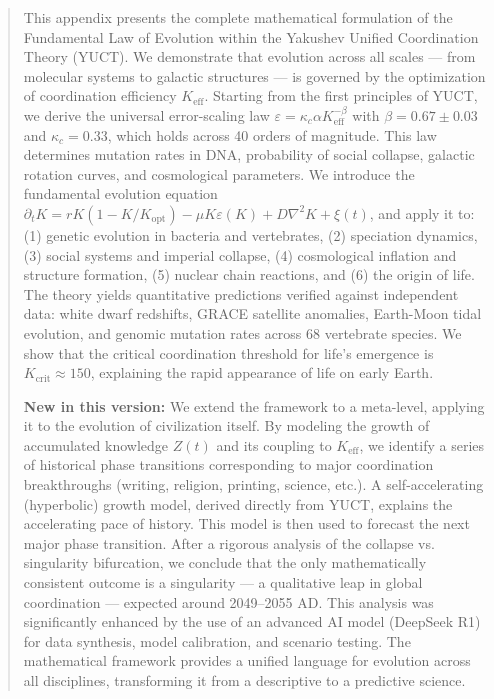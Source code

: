 \documentclass[12pt,a4paper]{article}
\theoremstyle{remark}
\newcommand{\Keff}{K_{\mathrm{eff}}}
\newcommand{\kappac}{\kappa_c}
\newcommand{\eps}{\varepsilon}
\begin{document}
\begin{titlepage}
\begin{center}
			\begin{minipage}{0.9\textwidth}
				\begin{abstract}
					\noindent
					This appendix presents the complete mathematical formulation of the Fundamental Law of Evolution within the Yakushev Unified Coordination Theory (YUCT). We demonstrate that evolution across all scales — from molecular systems to galactic structures — is governed by the optimization of coordination efficiency $\Keff$. Starting from the first principles of YUCT, we derive the universal error-scaling law $\eps = \kappac \alpha \Keff^{-\beta}$ with $\beta = 0.67 \pm 0.03$ and $\kappac = 0.33$, which holds across 40 orders of magnitude. This law determines mutation rates in DNA, probability of social collapse, galactic rotation curves, and cosmological parameters. We introduce the fundamental evolution equation $\partial_t K = rK(1-K/K_{\mathrm{opt}}) - \mu K \eps(K) + D\nabla^2 K + \xi(t)$, and apply it to: (1) genetic evolution in bacteria and vertebrates, (2) speciation dynamics, (3) social systems and imperial collapse, (4) cosmological inflation and structure formation, (5) nuclear chain reactions, and (6) the origin of life. The theory yields quantitative predictions verified against independent data: white dwarf redshifts, GRACE satellite anomalies, Earth-Moon tidal evolution, and genomic mutation rates across 68 vertebrate species. We show that the critical coordination threshold for life's emergence is $K_{\mathrm{crit}} \approx 150$, explaining the rapid appearance of life on early Earth. 
					
					\noindent
					\textbf{New in this version:} We extend the framework to a meta-level, applying it to the evolution of civilization itself. By modeling the growth of accumulated knowledge $Z(t)$ and its coupling to $K_{\text{eff}}$, we identify a series of historical phase transitions corresponding to major coordination breakthroughs (writing, religion, printing, science, etc.). A self-accelerating (hyperbolic) growth model, derived directly from YUCT, explains the accelerating pace of history. This model is then used to forecast the next major phase transition. After a rigorous analysis of the collapse vs. singularity bifurcation, we conclude that the only mathematically consistent outcome is a singularity — a qualitative leap in global coordination — expected around 2049–2055 AD. This analysis was significantly enhanced by the use of an advanced AI model (DeepSeek R1) for data synthesis, model calibration, and scenario testing. The mathematical framework provides a unified language for evolution across all disciplines, transforming it from a descriptive to a predictive science.
				\end{abstract}
			\end{minipage}
			

\end{center}
\end{titlepage}
\end{document}
